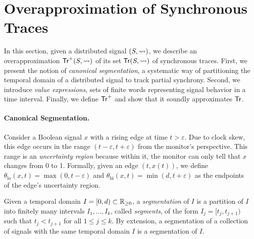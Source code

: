 \section{Overapproximation of Synchronous Traces} 
\label{sec:approach}

In this section, given a distributed signal $(S,{\rightsquigarrow})$, we describe an overapproximation $\mathsf{Tr}^+(S,{\rightsquigarrow})$ of its set $\mathsf{Tr}(S,{\rightsquigarrow})$ of synchronous traces.
First, we present the notion of \emph{canonical segmentation}, a systematic way of partitioning the temporal domain of a distributed signal to track partial synchrony.
Second, we introduce \emph{value expressions}, sets of finite words representing signal behavior in a time interval.
Finally, we define $\mathsf{Tr}^+$ and show that it soundly approximates $\mathsf{Tr}$.


\paragraph*{Canonical Segmentation.}
Consider a Boolean signal $x$ with a rising edge at time $t > \varepsilon$.
Due to clock skew, this edge occurs in the range $(t - \varepsilon, t + \varepsilon)$ from the monitor's perspective.
This range is an \emph{uncertainty region} because within it, the monitor can only tell that $x$ changes from 0 to 1. Formally, given an edge $(t, x(t))$, we define $\theta_{\text{lo}}(x,t) = \max(0, t - \varepsilon)$ and $\theta_{\text{hi}}(x,t) = \min(d, t + \varepsilon)$ as the endpoints of the edge's uncertainty region.

Given a temporal domain $I = [0,d) \subset \mathbb{R}_{\geq 0}$, a \emph{segmentation} of $I$ is a partition of $I$ into finitely many intervals $I_1, \ldots, I_k$, called \emph{segments}, of the form $I_j = [t_j, t_{j+1})$ such that $t_j < t_{j+1}$ for all $1 \leq j \leq k$.
By extension, a segmentation of a collection of signals with the same temporal domain $I$ is a segmentation of $I$.

